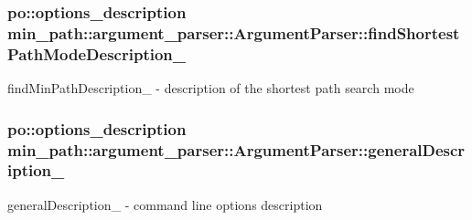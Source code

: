\subsubsection[{\texorpdfstring{find\+Shortest\+Path\+Mode\+Description\+\_\+}{findShortestPathModeDescription_}}]{\setlength{\rightskip}{0pt plus 5cm}po\+::options\+\_\+description min\+\_\+path\+::argument\+\_\+parser\+::\+Argument\+Parser\+::find\+Shortest\+Path\+Mode\+Description\+\_\+\hspace{0.3cm}{\ttfamily [private]}}\hypertarget{a00002_a6ed91e0b976c665765f35aa51fefba87_a6ed91e0b976c665765f35aa51fefba87}{}\label{a00002_a6ed91e0b976c665765f35aa51fefba87_a6ed91e0b976c665765f35aa51fefba87}


find\+Min\+Path\+Description\+\_\+ -\/ description of the shortest path search mode 

\subsubsection[{\texorpdfstring{general\+Description\+\_\+}{generalDescription_}}]{\setlength{\rightskip}{0pt plus 5cm}po\+::options\+\_\+description min\+\_\+path\+::argument\+\_\+parser\+::\+Argument\+Parser\+::general\+Description\+\_\+\hspace{0.3cm}{\ttfamily [private]}}\hypertarget{a00002_a1fa87430e08e605b208fd532e73ac236_a1fa87430e08e605b208fd532e73ac236}{}\label{a00002_a1fa87430e08e605b208fd532e73ac236_a1fa87430e08e605b208fd532e73ac236}


general\+Description\+\_\+ -\/ command line options description 

